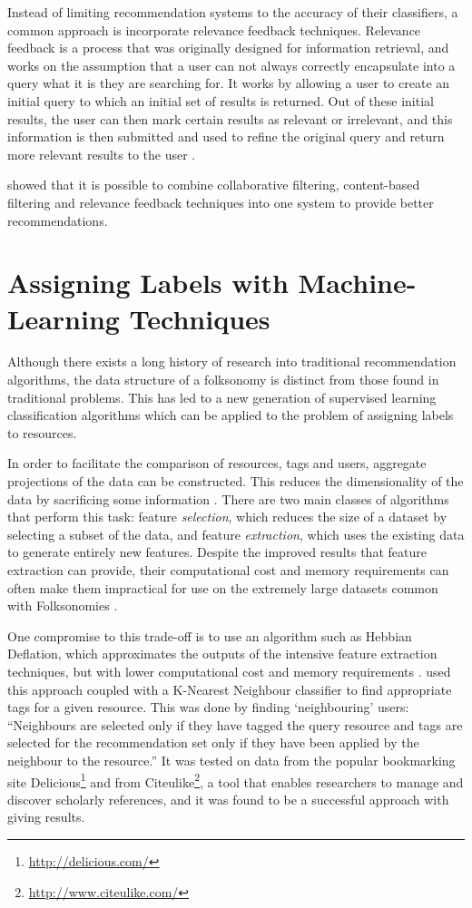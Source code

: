 \documentclass[11pt,a4paper]{report}
\begin{document}
Instead of limiting recommendation systems to the accuracy of their classifiers, a common approach is incorporate relevance feedback techniques. Relevance feedback is a process that was originally designed for information retrieval, and works on the assumption that a user can not always correctly encapsulate into a query what it is they are searching for. It works by allowing a user to create an initial query to which an initial set of results is returned. Out of these initial results, the user can then mark certain results as relevant or irrelevant, and this information is then submitted and used to refine the original query and return more relevant results to the user \parencite{Salton:1990}.

\textcite{Utiyama:2006} showed that it is possible to combine collaborative filtering, content-based filtering and relevance feedback techniques into one system to provide better recommendations.

\section{Assigning Labels with Machine-Learning Techniques}
Although there exists a long history of research into traditional recommendation algorithms, the data structure of a folksonomy is distinct from those found in traditional problems. This has led to a new generation of supervised learning classification algorithms which can be applied to the problem of assigning labels to resources.

In order to facilitate the comparison of resources, tags and users, aggregate projections of the data can be constructed. This reduces the dimensionality of the data by sacrificing some information \parencite{Schmitz:2006}. There are two main classes of algorithms that perform this task: feature \emph{selection}, which reduces the size of a dataset by selecting a subset of the data, and feature \emph{extraction}, which uses the existing data to generate entirely new features. Despite the improved results that feature extraction can provide, their computational cost and memory requirements can often make them impractical for use on the extremely large datasets common with Folksonomies \parencite{Gemmell:2009}.

One compromise to this trade-off is to use an algorithm such as Hebbian Deflation, which approximates the outputs of the intensive feature extraction techniques, but with lower computational cost and memory requirements \parencite{Oja:1985}. \textcite{Gemmell:2009} used this approach coupled with a K-Nearest Neighbour classifier to find appropriate tags for a given resource. This was done by finding `neighbouring' users: ``Neighbours are selected only if they have tagged the query resource and tags are selected for the recommendation set only if they have been applied by the neighbour to the resource.'' It was tested on data from the popular bookmarking site Delicious\footnote{\url{http://delicious.com/}} and from Citeulike\footnote{\url{http://www.citeulike.com/}}, a tool that enables researchers to manage and discover scholarly references, and it was found to be a successful approach with giving results.
\end{document}
